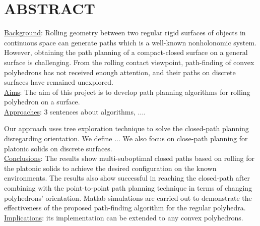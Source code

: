 
\noindent\section{ABSTRACT}
\noindent \uline{Background}: 
Rolling geometry between two regular rigid surfaces of objects in continuous space can generate paths which is a well-known nonholonomic system. However, obtaining the path planning of a compact-closed surface on a general surface is challenging. From the rolling contact viewpoint, path-finding of convex polyhedrons has not received enough attention, and their paths on discrete surfaces have remained unexplored. \\

\noindent \uline{Aims}: The aim of this project is to develop path planning algorithms for rolling polyhedron on a surface.\\

\noindent \uline{Approaches}: 3 sentences about algorithms, ....

Our approach uses tree exploration technique to solve the closed-path planning disregarding orientation. 
We define ...
We also focus on close-path planning for platonic solids on discrete surfaces.\\

\noindent \uline{Conclusions}: 
The results show multi-suboptimal closed paths based on rolling for the platonic solids to achieve the desired configuration on the known environments. 
The results also show successful in reaching the closed-path after combining with the point-to-point path planning technique in terms of changing polyhedrons' orientation.
Matlab simulations are carried out to demonstrate the effectiveness of the proposed path-finding algorithm for the regular polyhedra. \\ 


\noindent \uline{Implications}: its implementation can be extended to any convex polyhedrons.




